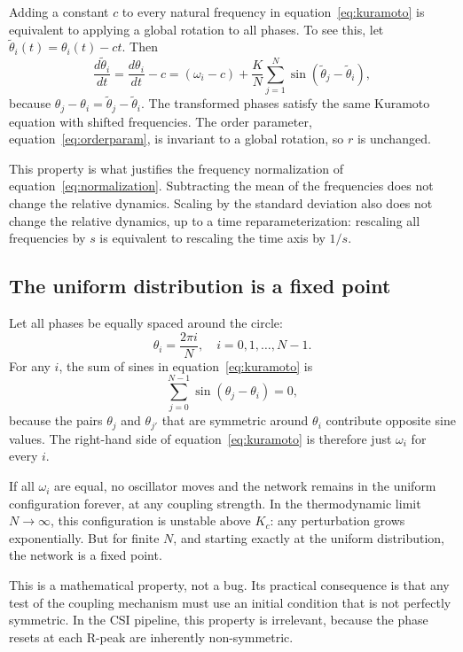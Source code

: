 \documentclass[11pt]{article}
\begin{document}
Adding a constant $c$ to every natural frequency in
equation~\eqref{eq:kuramoto} is equivalent to applying a global rotation
to all phases. To see this, let $\tilde{\theta}_i(t) = \theta_i(t) - ct$.
Then
\begin{equation}
\frac{d\tilde{\theta}_i}{dt} = \frac{d\theta_i}{dt} - c
= (\omega_i - c) + \frac{K}{N}\sum_{j=1}^{N}
\sin(\tilde{\theta}_j - \tilde{\theta}_i),
\label{eq:offset}
\end{equation}
because $\theta_j - \theta_i = \tilde{\theta}_j - \tilde{\theta}_i$.
The transformed phases satisfy the same Kuramoto equation with shifted
frequencies. The order parameter, equation~\eqref{eq:orderparam}, is
invariant to a global rotation, so $r$ is unchanged.

This property is what justifies the frequency normalization of
equation~\eqref{eq:normalization}. Subtracting the mean of the
frequencies does not change the relative dynamics. Scaling by the
standard deviation also does not change the relative dynamics, up to a
time reparameterization: rescaling all frequencies by $s$ is equivalent
to rescaling the time axis by $1/s$.

\subsection{The uniform distribution is a fixed point}

Let all phases be equally spaced around the circle:
\begin{equation}
\theta_i = \frac{2\pi i}{N}, \quad i = 0, 1, \ldots, N-1.
\label{eq:uniform}
\end{equation}
For any $i$, the sum of sines in equation~\eqref{eq:kuramoto} is
\begin{equation}
\sum_{j=0}^{N-1} \sin(\theta_j - \theta_i) = 0,
\label{eq:zero}
\end{equation}
because the pairs $\theta_j$ and $\theta_{j'}$ that are symmetric
around $\theta_i$ contribute opposite sine values. The right-hand side
of equation~\eqref{eq:kuramoto} is therefore just $\omega_i$ for every
$i$.

If all $\omega_i$ are equal, no oscillator moves and the network remains
in the uniform configuration forever, at any coupling strength. In the
thermodynamic limit $N \to \infty$, this configuration is unstable
above $K_c$: any perturbation grows exponentially. But for finite $N$,
and starting exactly at the uniform distribution, the network is a fixed
point.

This is a mathematical property, not a bug. Its practical consequence is
that any test of the coupling mechanism must use an initial condition
that is not perfectly symmetric. In the CSI pipeline, this property is
irrelevant, because the phase resets at each R-peak are inherently
non-symmetric.
\end{document}
